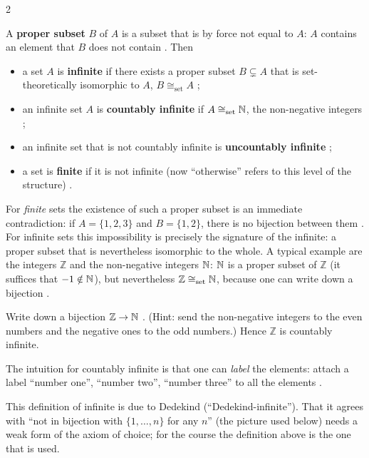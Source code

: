 \begin{paracol}{2}
\begin{definition}\label{def:cl-infinite}
A \textbf{proper subset} $B$ of $A$ is a subset that is by force not equal to $A$: $A$ contains an element that $B$ does
not contain . Then
\begin{itemize}
  \item a set $A$ is \textbf{infinite} if there exists a proper subset $B\subsetneq A$ that is set-theoretically
        isomorphic to $A$, $B\cong_{\mathrm{set}}A$ ;
  \item an infinite set $A$ is \textbf{countably infinite} if $A\cong_{\mathrm{set}}\mathbb{N}$, the non-negative integers
        ;
  \item an infinite set that is not countably infinite is \textbf{uncountably infinite} ;
  \item a set is \textbf{finite} if it is not infinite (now ``otherwise'' refers to this level of the structure)
        .
\end{itemize}
\end{definition}
For \emph{finite} sets the existence of such a proper subset is an immediate contradiction: if $A=\{1,2,3\}$ and
$B=\{1,2\}$, there is no bijection between them . For infinite sets this impossibility is
precisely the signature of the infinite: a proper subset that is nevertheless isomorphic to the whole. A typical
example are the integers $\mathbb Z$ and the non-negative integers $\mathbb{N}$: $\mathbb{N}$ is a proper subset of $\mathbb Z$ (it
suffices that $-1\notin\mathbb{N}$), but nevertheless $\mathbb Z\cong_{\mathrm{set}}\mathbb{N}$, because one can write down a
bijection .

\begin{exercise}\label{ex:cl-ZN}
Write down a bijection $\mathbb Z\to\mathbb{N}$ . (Hint: send the non-negative integers to the even numbers and
the negative ones to the odd numbers.) Hence $\mathbb Z$ is countably infinite.
\end{exercise}

The intuition for countably infinite is that one can \emph{label} the elements: attach a label ``number one'',
``number two'', ``number three'' to all the elements .

\begin{coursenote}
This definition of infinite is due to Dedekind (``Dedekind-infinite''). That it agrees with ``not in bijection with
$\{1,\dots,n\}$ for any $n$'' (the picture used below) needs a weak form of the axiom of choice; for the course the
definition above is the one that is used.
\end{coursenote}


\end{paracol}
